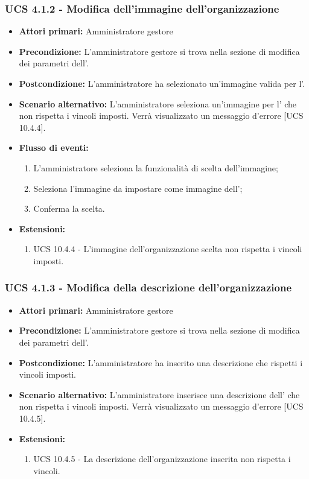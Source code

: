 \subsubsection{UCS 4.1.2 - Modifica dell'immagine dell'organizzazione}%
\begin{itemize}
	\item \textbf{Attori primari:} Amministratore gestore
	\item \textbf{Precondizione:} L'amministratore gestore si trova nella sezione di modifica dei parametri dell'.
	\item \textbf{Postcondizione:} L'amministratore ha selezionato un'immagine valida per l'.
	\item \textbf{Scenario alternativo:} L'amministratore seleziona un'immagine per l' che non rispetta i vincoli imposti. Verrà visualizzato un messaggio d'errore [UCS 10.4.4].
	\item \textbf{Flusso di eventi:}
	\begin{enumerate}
		\item L'amministratore seleziona la funzionalità di scelta dell'immagine;
		\item Seleziona l'immagine da impostare come immagine dell';
		\item Conferma la scelta.
	\end{enumerate}
	\item \textbf{Estensioni:}
	\begin{enumerate}
		\item UCS 10.4.4 - L'immagine dell'organizzazione scelta non rispetta i vincoli imposti.
	\end{enumerate}
\end{itemize}

\subsubsection{UCS 4.1.3 - Modifica della descrizione dell'organizzazione}%
\begin{itemize}
	\item \textbf{Attori primari:} Amministratore gestore
	\item \textbf{Precondizione:} L'amministratore gestore si trova nella sezione di modifica dei parametri dell'.
	\item \textbf{Postcondizione:} L'amministratore ha inserito una descrizione che rispetti i vincoli imposti.
	\item \textbf{Scenario alternativo:} L'amministratore inserisce una descrizione dell' che non rispetta i vincoli imposti. Verrà visualizzato un messaggio d'errore [UCS 10.4.5].
	\item \textbf{Estensioni:}
	\begin{enumerate}
		\item UCS 10.4.5 - La descrizione dell'organizzazione inserita non rispetta i vincoli.
	\end{enumerate}
\end{itemize}

